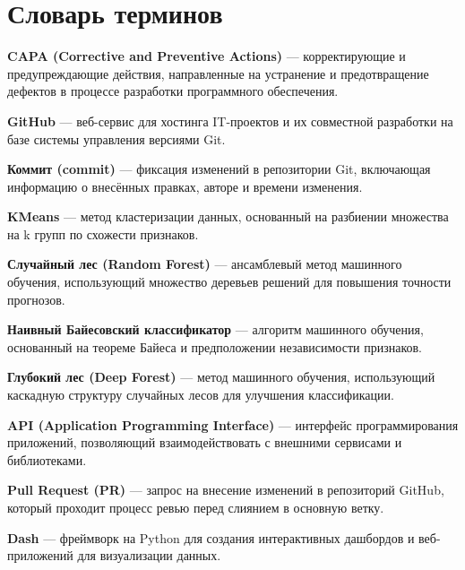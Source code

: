 \chapter*{Словарь терминов}             %

\textbf{CAPA (Corrective and Preventive Actions)} --- корректирующие и предупреждающие действия, направленные на устранение и предотвращение дефектов в процессе разработки программного обеспечения.

\textbf{GitHub} --- веб-сервис для хостинга IT-проектов и их совместной разработки на базе системы управления версиями Git.

\textbf{Коммит (commit)} --- фиксация изменений в репозитории Git, включающая информацию о внесённых правках, авторе и времени изменения.

\textbf{KMeans} --- метод кластеризации данных, основанный на разбиении множества на k групп по схожести признаков.

\textbf{Случайный лес (Random Forest)} --- ансамблевый метод машинного обучения, использующий множество деревьев решений для повышения точности прогнозов.

\textbf{Наивный Байесовский классификатор} --- алгоритм машинного обучения, основанный на теореме Байеса и предположении независимости признаков.

\textbf{Глубокий лес (Deep Forest)} --- метод машинного обучения, использующий каскадную структуру случайных лесов для улучшения классификации.

\textbf{API (Application Programming Interface)} --- интерфейс программирования приложений, позволяющий взаимодействовать с внешними сервисами и библиотеками.

\textbf{Pull Request (PR)} --- запрос на внесение изменений в репозиторий GitHub, который проходит процесс ревью перед слиянием в основную ветку.

\textbf{Dash} --- фреймворк на Python для создания интерактивных дашбордов и веб-приложений для визуализации данных.
